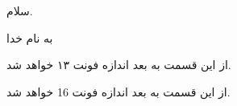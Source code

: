 \documentclass[10pt]{article}
\begin{document}
	سلام.

	به نام خدا

	\fontsize{13}{14}\selectfont
	از این قسمت به بعد اندازه فونت ۱۳ خواهد شد.

	\fontsize{16}{17}\selectfont
	از این قسمت به بعد اندازه فونت 16 خواهد شد.
\end{document}
